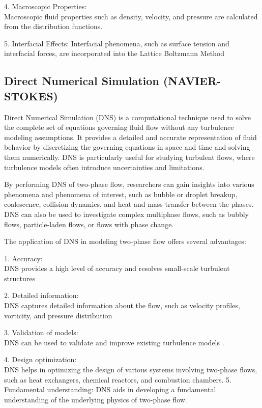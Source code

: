 \documentclass[letterpaper,12pt]{article}
\begin{document}
	4. Macroscopic Properties:\\
		 Macroscopic fluid properties such as density, velocity, and pressure are calculated from the distribution functions.
	
	5. Interfacial Effects:
		 Interfacial phenomena, such as surface tension and interfacial forces, are incorporated into the Lattice Boltzmann Method
	

	\subsection {Direct Numerical Simulation (NAVIER-STOKES)}
	Direct Numerical Simulation (DNS) is a computational technique used to solve the complete set of equations governing fluid flow without any turbulence modeling assumptions. It provides a detailed and accurate representation of fluid behavior by discretizing the governing equations in space and time and solving them numerically. DNS is particularly useful for studying turbulent flows, where turbulence models often introduce uncertainties and limitations.
	

	
	By performing DNS of two-phase flow, researchers can gain insights into various phenomena and phenomena of interest, such as bubble or droplet breakup, coalescence, collision dynamics, and heat and mass transfer between the phases. DNS can also be used to investigate complex multiphase flows, such as bubbly flows, particle-laden flows, or flows with phase change.
	
	The application of DNS in modeling two-phase flow offers several advantages:
	
	1. Accuracy:\\
		 DNS provides a high level of accuracy and resolves small-scale turbulent structures
	
	2. Detailed information: \\
		DNS captures detailed information about the flow, such as velocity profiles, vorticity, and pressure distribution
	
	3. Validation of models:\\
		 DNS can be used to validate and improve existing turbulence models .
	
	4. Design optimization:\\
		 DNS helps in optimizing the design of various systems involving two-phase flows, such as heat exchangers, chemical reactors, and combustion chambers.
	5. Fundamental understanding:
		 DNS aids in developing a fundamental understanding of the underlying physics of two-phase flow.
	
\end{document}
